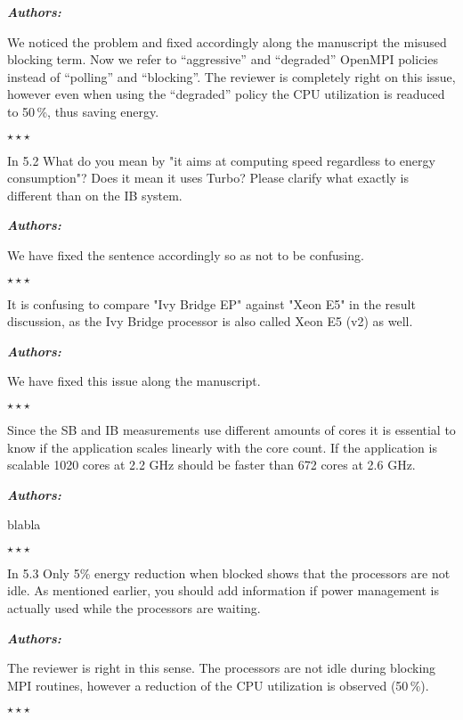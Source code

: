 \documentclass[a4paper,11pt]{article}
\newcounter{question}
\newcommand{\weReply}{\vspace{0.25cm} {\bf \noindent } \addtocounter{question}{1} \textbf{\emph{Authors:}} \medskip \em\par}
\newenvironment{weSay}{\bigskip \weReply \begin{it}}{\end{it}\begin{center} \samepage$\star \star \star$ \end{center}}
\begin{document}
\begin{weSay}
We noticed the problem and fixed accordingly along the manuscript the misused blocking term.
Now we refer to ``aggressive'' and ``degraded'' OpenMPI policies instead of ``polling''
and ``blocking''. The reviewer is completely right on this issue, however even when using
the ``degraded'' policy the CPU utilization is readuced to 50\,\%, thus saving energy.
\end{weSay}

In 5.2
What do you mean by "it aims at computing speed regardless to energy consumption"?
Does it mean it uses Turbo? Please clarify what exactly is different than on the
IB system.

\begin{weSay}
We have fixed the sentence accordingly so as not to be confusing.
\end{weSay}

It is confusing to compare "Ivy Bridge EP" against "Xeon E5" in the result
discussion, as the Ivy Bridge processor is also called Xeon E5 (v2) as well.

\begin{weSay}
We have fixed this issue along the manuscript.
\end{weSay}

Since the SB and IB measurements use different amounts of cores it is essential to
know if the application scales linearly with the core count. If the application
is scalable 1020 cores at 2.2 GHz should be faster than 672 cores at 2.6 GHz.

\begin{weSay}
blabla
\end{weSay}

In 5.3
Only 5\% energy reduction when blocked shows that the processors are not idle.
As mentioned earlier, you should add information if power management is
actually used while the processors are waiting.

\begin{weSay}
The reviewer is right in this sense. The processors are not idle during blocking MPI routines, however a reduction of the CPU utilization is observed (50\,\%).
\end{weSay}
\end{document}

